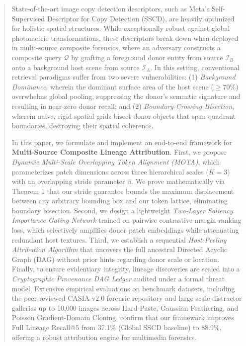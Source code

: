 \documentclass[journal]{IEEEtran}
\begin{document}
\begin{abstract}
State-of-the-art image copy detection descriptors, such as Meta's Self-Supervised Descriptor for Copy Detection (SSCD), are heavily optimized for holistic spatial structures. While exceptionally robust against global photometric transformations, these descriptors break down when deployed in multi-source composite forensics, where an adversary constructs a composite query $\mathcal{Q}$ by grafting a foreground donor entity from source $\mathcal{I}_B$ onto a background host scene from source $\mathcal{I}_A$. In this setting, conventional retrieval paradigms suffer from two severe vulnerabilities: (1) \textit{Background Dominance}, wherein the dominant surface area of the host scene ($\ge 70\%$) overwhelms global pooling, suppressing the donor's semantic signature and resulting in near-zero donor recall; and (2) \textit{Boundary-Crossing Bisection}, wherein naive, rigid spatial grids bisect donor objects that span quadrant boundaries, destroying their spatial coherence. 

In this paper, we formulate and implement an end-to-end framework for \textbf{Multi-Source Composite Lineage Attribution}. First, we propose \textit{Dynamic Multi-Scale Overlapping Token Alignment (MOTA)}, which parameterizes patch dimensions across three hierarchical scales ($K=3$) with an overlapping stride parameter $\beta$. We prove mathematically via Theorem 1 that our stride guarantee bounds the maximum displacement between any arbitrary bounding box and our token lattice, eliminating boundary bisection. Second, we design a lightweight \textit{Two-Layer Saliency Importance Gating Network} trained on pairwise contrastive margin-ranking loss, which selectively amplifies donor patch embeddings while attenuating redundant host textures. Third, we establish a sequential \textit{Host-Peeling Attribution Algorithm} that uncovers the full ancestral Directed Acyclic Graph (DAG) without prior hints regarding donor scale or location. Finally, to ensure evidentiary integrity, lineage discoveries are sealed into a \textit{Cryptographic Provenance DAG Ledger} audited under a formal threat model. Extensive empirical evaluations on benchmark datasets, including the peer-reviewed CASIA v2.0 forensic repository and large-scale distractor galleries up to 10,000 images across Hard-Paste, Gaussian Feathering, and Poisson Gradient-Domain Cloning, confirm that our framework improves Full Lineage Recall@5 from 37.1\% (Global SSCD baseline) to 88.9\%, offering a robust attribution engine for multimedia forensics.
\end{abstract}
\end{document}
